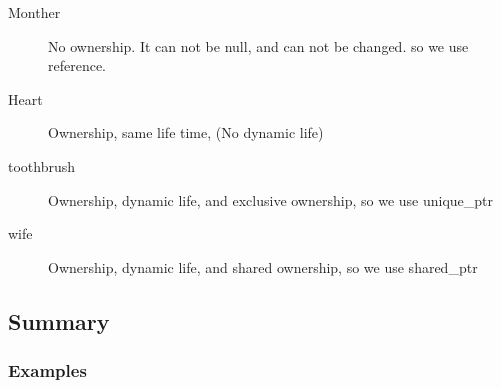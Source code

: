 \documentclass[a4paper,11pt,twoside]{book}
\begin{document}
\begin{itemize}
\begin{enumerate}
\begin{description}
	\item[Monther] No ownership. It can not be null, and can not be changed.  so we use reference. 
	
	\item[Heart] Ownership, same life time, (No dynamic life)
	
	\item [toothbrush] Ownership, dynamic life, and exclusive ownership, so we use unique\_ptr
	
	\item [wife] Ownership, dynamic life, and shared ownership, so we use shared\_ptr
\end{description}

\end{enumerate}


	
\end{itemize}
\subsection{Summary}

\subsubsection{Examples}
\end{document}
